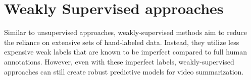 \section{Weakly Supervised approaches}
\label{section:rel-weakly}

Similar to unsupervised approaches, weakly-supervised methods aim to reduce the reliance on extensive sets of hand-labeled data. Instead, they utilize less expensive weak labels that are known to be imperfect compared to full human annotations. However, even with these imperfect labels, weakly-supervised approaches can still create robust predictive models for video summarization.




